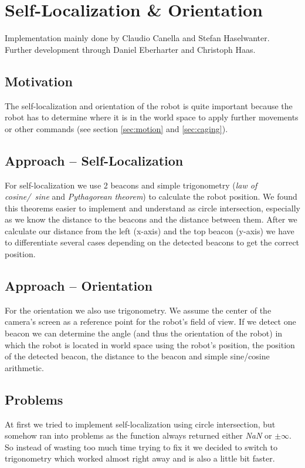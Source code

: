 \documentclass[703031]{iisreport}
\begin{document}
\section{Self-Localization \& Orientation}
\label{sec:localization}
Implementation mainly done by Claudio Canella and Stefan Haselwanter. \\
Further development through Daniel Eberharter and Christoph Haas.

\subsection{Motivation}
The self-localization and orientation of the robot is quite important because the robot has to determine where it is in the world space to apply further movements or other commands (see section \ref{sec:motion} and \ref{sec:caging}).

\subsection{Approach -- Self-Localization}
For self-localization we use 2 beacons and simple trigonometry (\emph{law of \mbox{cosine}/\ sine} and \emph{Pythagorean theorem}) to calculate the robot position. We found this theorems easier to implement and understand as circle intersection, especially as we know the distance to the beacons and the distance between them. After we calculate our distance from the left (x-axis) and the top beacon (y-axis) we have to differentiate several cases depending on the detected beacons to get the correct position.

\subsection{Approach -- Orientation}
For the orientation we also use trigonometry. We assume the center of the camera's screen as a reference point for the robot's field of view. If we detect one beacon we can determine the angle (and thus the orientation of the robot) in which the robot is located in world space using the robot's position, the position of the detected beacon, the distance to the beacon and simple sine/cosine arithmetic.

\subsection{Problems}
At first we tried to implement self-localization using circle intersection, but somehow ran into problems as the function always returned either \emph{NaN} or $\pm \infty$. So instead of wasting too much time trying to fix it we decided to switch to trigonometry which worked almost right away and is also a little bit faster.
\end{document}

